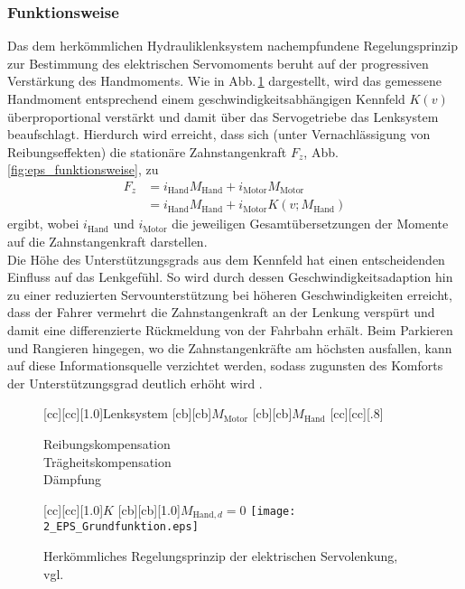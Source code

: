 \subsubsection{Funktionsweise} \label{sec:eps_funktionsweise}
Das dem herkömmlichen Hydrauliklenksystem nachempfundene Regelungsprinzip zur Bestimmung des elektrischen Servomoments beruht auf der progressiven Verstärkung des Handmoments. Wie in Abb.\,\ref{fig:eps_grundfunktion} dargestellt, wird das gemessene Handmoment entsprechend einem geschwindigkeitsabhängigen Kennfeld $K(v)$ überproportional verstärkt und damit über das Servogetriebe das Lenksystem beaufschlagt. Hierdurch wird erreicht, dass sich (unter Vernachlässigung von Reibungseffekten) die stationäre Zahnstangenkraft $F_z$, Abb.\,\ref{fig:eps_funktionsweise}, zu
\begin{align}
\label{equ:eps_f_z_0}
	F_z &= i_\text{Hand} M_\text{Hand} + i_\text{Motor} M_\text{Motor} \\
	\label{equ:eps_f_z}
	&= i_\text{Hand} M_\text{Hand} + i_\text{Motor} K(v;M_\text{Hand}) 
\end{align}
ergibt, wobei $i_\text{Hand}$ und $i_\text{Motor}$ die jeweiligen Gesamtübersetzungen der Momente auf die Zahnstangenkraft darstellen. \\
Die Höhe des Unterstützungsgrads aus dem Kennfeld hat einen entscheidenden Einfluss auf das Lenkgefühl. So wird durch dessen Geschwindigkeitsadaption hin zu einer reduzierten Servounterstützung bei höheren Geschwindigkeiten erreicht, dass der Fahrer vermehrt die Zahnstangenkraft an der Lenkung verspürt und damit eine differenzierte Rückmeldung von der Fahrbahn erhält. Beim Parkieren und Rangieren hingegen, wo die Zahnstangenkräfte am höchsten ausfallen, kann auf diese Informationsquelle verzichtet werden, sodass zugunsten des Komforts der Unterstützungsgrad deutlich erhöht wird \cite{pfeffer2013lenkungshandbuch}.

\begin{figure}[ht]
\newcommand{\smallsize}{.8}
	[cc][cc][1.0]{Lenksystem}
	[cb][cb]{$M_\text{Motor}$}
	[cb][cb]{$M_\text{Hand}$}
	[cc][cc][\smallsize]{{\parbox[c]{7cm}{\begin{center} Reibungskompensation \\ Trägheitskompensation \\ Dämpfung \end{center}}}}
	[cc][cc][1.0]{$K$}
	[cb][cb][1.0]{$M_{\text{Hand},d}\!=\!0$}
\centering
\texttt{[image: 2\_EPS\_Grundfunktion.eps]}
 \caption[Herkömmliches Regelungsprinzip der elektrischen Servolenkung]{Herkömmliches Regelungsprinzip der elektrischen Servolenkung, vgl.\ \cite{pfeffer2013lenkungshandbuch}}
 \label{fig:eps_grundfunktion}
\end{figure} 

